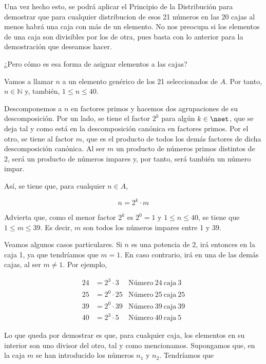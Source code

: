 Una vez hecho esto, se podrá aplicar el Principio de la Distribución para
demostrar que para cualquier distribucion de esos 21 números en las 20 cajas
al menos habrá una caja con más de un elemento. No nos preocupa si los
elementos de una caja son divisibles por los de otra, pues basta con lo
anterior para la demostración que deseamos hacer.

¿Pero cómo es esa forma de asignar elementos a las cajas?

Vamos a llamar $n$ a un elemento genérico de los 21 seleccionados de $A$.
Por tanto, $n \in \mathbb{N}$ y, también, $1 \leq n \leq 40$.

Descomponemos a $n$ en factores primos y hacemos dos agrupaciones de su
descomposición. Por un lado, se tiene el factor $2^k$ para algún $k \in
\nset$, que se deja tal y como está en la descomposición canónica en
factores primos. Por el otro, se tiene al factor $m$, que es el producto de
todos los demás factores de dicha descomposición canónica. Al ser $m$ un
producto de números primos distintos de 2, será un producto de números
impares y, por tanto, será también un número impar.

Así, se tiene que, para cualquier $n \in A$,

$$ n = 2^k \cdot m $$

\noindent Advierta que, como el menor factor $2^k$ es $2^0 = 1$ y $1 \leq n
\leq 40$, se tiene que $1 \leq m \leq 39$. Es decir, $m$ son todos los
números impares entre 1 y 39.

Veamos algunos casos particulares. Si $n$ es una potencia de 2, irá entonces
en la caja 1, ya que tendríamos que $m = 1$. En caso contrario, irá en una
de las demás cajas, al ser $m \neq 1$. Por ejemplo,

\begin{equation*}
  \begin{array}{lll}
    24 &= 2^3 \cdot 3     & \text{Número} \ 24 \ \text{caja} \ 3 \\
    25 &= 2^0 \cdot 25    & \text{Número} \ 25 \ \text{caja} \ 25 \\
    39 &= 2^0 \cdot 39    & \text{Número} \ 39 \ \text{caja} \ 39 \\
    40 &= 2^3 \cdot 5     & \text{Número} \ 40 \ \text{caja} \ 5
  \end{array}
\end{equation*}

Lo que queda por demostrar es que, para cualquier caja, los elementos en su
interior son uno divisor del otro, tal y como mencionamos. Supongamos que,
en la caja $m$ se han introducido los números $n_1$ y $n_2$. Tendríamos que

